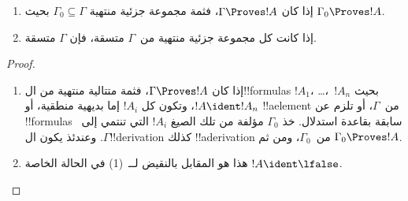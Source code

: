 \documentclass[../../../include/open-logic-section]{subfiles}
\begin{document}
\begin{prop}[التراص]
  \begin{enumerate}
  \item إذا كان $\Gamma \Proves !A$، فثمة مجموعة جزئية منتهية $\Gamma_0
    \subseteq \Gamma$ بحيث $\Gamma_0 \Proves !A$.
  \item إذا كانت كل مجموعة جزئية منتهية من~$\Gamma$ متسقة، فإن
    $\Gamma$ متسقة.
  \end{enumerate}
\end{prop}

\begin{proof}
  \begin{enumerate}
    \item إذا كان $\Gamma \Proves !A$، فثمة متتالية منتهية من
      ال!!{formula}s $!A_1$، \dots،~$!A_n$ بحيث $!A \ident !A_n$، وتكون
      كل $!A_i$ إما بديهية منطقية، أو !!a{element} من~$\Gamma$، أو تلزم
      عن !!{formula}s سابقة بقاعدة استدلال. خذ $\Gamma_0$ مؤلفة من تلك
      الصيغ $!A_i$ التي تنتمي إلى~$\Gamma$. وعندئذ يكون ال!!{derivation}
      كذلك !!a{derivation} من~$\Gamma_0$، ومن ثم
      $\Gamma_0 \Proves !A$.
    \item هذا هو المقابل بالنقيض لــ~(1) في الحالة الخاصة $!A
      \ident \lfalse$.
\end{enumerate}
\end{proof}
\end{document}
